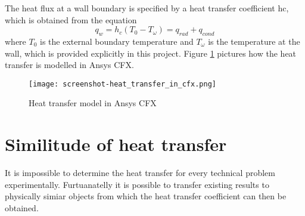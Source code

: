 The heat flux at a wall boundary is specified by a heat transfer coefficient hc, which is obtained from the equation
\begin{equation}
q_w = h_c (T_0 - T_{\omega} ) = q_{rad} + q_{cond}
\end{equation}
where $T_0$ is the external boundary temperature and $T_{\omega}$ is the temperature at the wall, which is provided explicitly in this project. Figure \ref{fig:ht_in_cfx} pictures how the heat transfer is modelled in Ansys CFX.
\begin{figure}[h]
\centering
\texttt{[image: screenshot-heat\_transfer\_in\_cfx.png]}
\caption{Heat transfer model in Ansys CFX}
\label{fig:ht_in_cfx}
\end{figure}
\section{Similitude of heat transfer}
It is impossible to determine the heat transfer for every technical problem experimentally. Furtuanatelly it is possible to transfer existing results to physically simiar objects from which the heat transfer coefficient can then be obtained.


